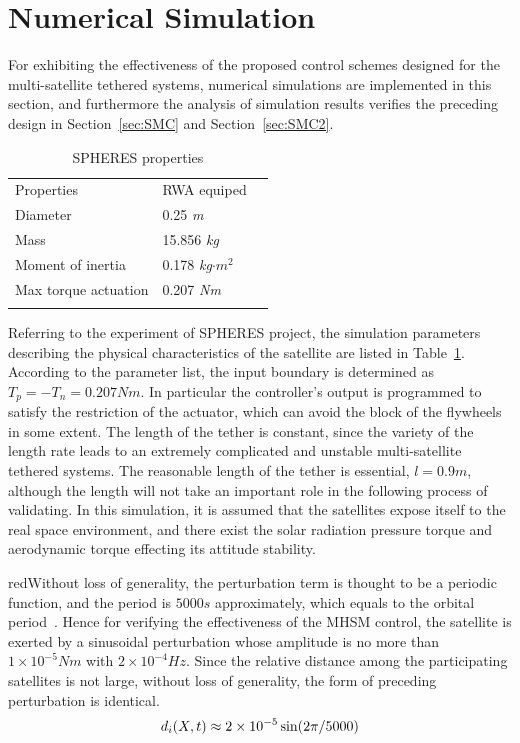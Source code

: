\section{Numerical Simulation}\label{sec:sm}
For exhibiting the effectiveness of the proposed control schemes designed for the multi-satellite tethered systems, numerical simulations are implemented in this section, and furthermore the analysis of simulation results verifies the preceding design in Section~\ref{sec:SMC} and Section~\ref{sec:SMC2}.\par
\begin{table}
\caption{SPHERES properties}\label{ta:properites}
\label{tab:1}       %
\begin{tabular}{lll}
\hline\noalign{\smallskip}
Properties              &RWA equiped\\
\noalign{\smallskip}\hline\noalign{\smallskip}
Diameter   &0.25 \textit{m}\\
Mass       &15.856 \textit{kg}\\
Moment of inertia        &0.178 \textit{kg}$\cdot m^2$\\
Max torque actuation   &0.207 \textit{Nm}\\
\noalign{\smallskip}\hline
\end{tabular}
\end{table}
Referring to the experiment of SPHERES project, the simulation parameters describing the physical characteristics of the satellite are listed in Table~\ref{tab:1}. According to the parameter list, the input boundary is determined as $T_p = -T_n = 0.207Nm$. In particular the controller's output is programmed to satisfy the restriction of the actuator, which can avoid the block of the flywheels in some extent. The length of the tether is constant, since the variety of the length rate leads to an extremely complicated and unstable multi-satellite tethered systems. The reasonable length of the tether is essential, $l = 0.9m$, although the length will not take an important role in the following process of validating. In this simulation, it is assumed that the satellites expose itself to the real space environment, and there exist the solar radiation pressure torque and aerodynamic torque effecting its attitude stability. \begin{color}{red}Without loss of generality, the perturbation term is thought to be a periodic function, and the period is $5000s$ approximately, which equals to the orbital period~\cite{inamori2015magnetic,liu2013calculation}. Hence for verifying the effectiveness of the MHSM control, the satellite is exerted by a sinusoidal perturbation whose amplitude is no more than $1\times 10^{-5}Nm$ with $2\times 10^{-4}Hz$. Since the relative distance among the participating satellites is not large, without loss of generality, the form of preceding perturbation is identical.
\begin{align}
d_i(X,t) \approx 2\times 10^{-5}\sin(2\pi/5000)\notag
\end{align}
\end{color}
